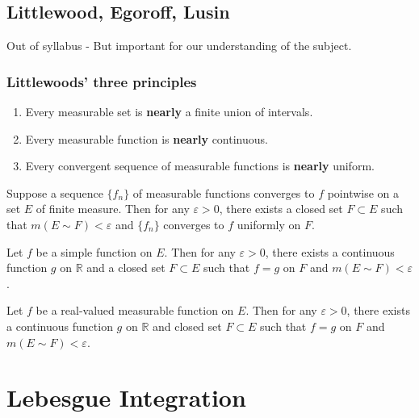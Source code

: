{\color{violet}
\subsection{Littlewood, Egoroff, Lusin}
Out of syllabus - But important for our understanding of the subject.
\subsubsection{Littlewoods' three principles}
\begin{enumerate}
	\item Every measurable set is \textbf{nearly} a finite union of intervals.
	\item Every measurable function is \textbf{nearly} continuous.
	\item Every convergent sequence of measurable functions is \textbf{nearly} uniform.
\end{enumerate}
\begin{theorem}[Egoroff]
	Suppose a sequence $\{ f_n \}$ of measurable functions converges to $f$ pointwise on a set $E$ of finite measure.
	Then for any $\varepsilon > 0$, there exists a closed set $F \subset E$ such that $m(E \sim F) < \varepsilon$ and $\{ f_n \}$ converges to $f$ uniformly on $F$.
\end{theorem}

\begin{theorem}
	Let $f$ be a simple function on $E$.
	Then for any $\varepsilon > 0$, there exists a continuous function $g$ on $\mathbb{R}$ and a closed set $F \subset E$ such that $f =g$ on $F$ and $m(E \sim F) < \varepsilon$.
\end{theorem}

\begin{theorem}[Lusin]
	Let $f$ be a real-valued measurable function on $E$.
	Then for any $\varepsilon > 0$, there exists a continuous function $g$ on $\mathbb{R}$ and closed set $F \subset E$ such that $f=g$ on $F$ and $m(E \sim F) < \varepsilon$.
\end{theorem}
}
\section{Lebesgue Integration}
